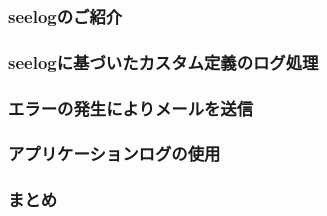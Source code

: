 
\subsubsection{seelogのご紹介}

\subsubsection{seelogに基づいたカスタム定義のログ処理}

\subsubsection{エラーの発生によりメールを送信}

\subsubsection{アプリケーションログの使用}

\subsubsection{まとめ}

